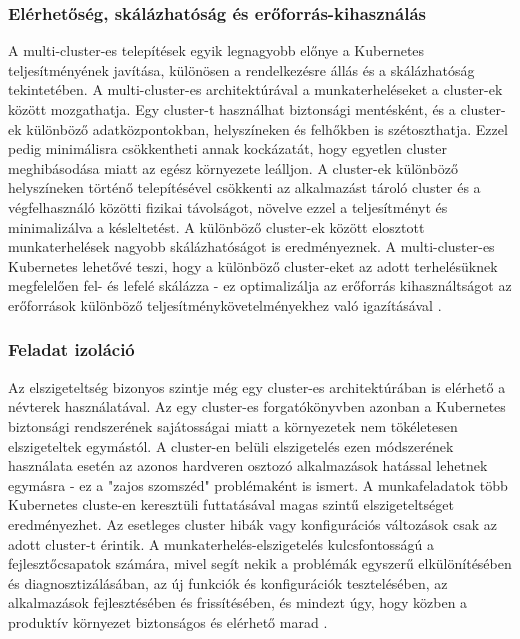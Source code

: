 \subsubsection*{Elérhetőség, skálázhatóság és erőforrás-kihasználás}
A multi-cluster-es telepítések egyik legnagyobb előnye a Kubernetes teljesítményének javítása, különösen a rendelkezésre állás és a skálázhatóság tekintetében.
A multi-cluster-es architektúrával a munkaterheléseket a cluster-ek között mozgathatja.
Egy cluster-t használhat biztonsági mentésként, és a cluster-ek különböző adatközpontokban, helyszíneken és felhőkben is szétoszthatja.
Ezzel pedig minimálisra csökkentheti annak kockázatát, hogy egyetlen cluster meghibásodása miatt az egész környezete leálljon.
A cluster-ek különböző helyszíneken történő telepítésével csökkenti az alkalmazást tároló cluster és a végfelhasználó közötti fizikai távolságot, növelve ezzel a teljesítményt és minimalizálva a késleltetést.
A különböző cluster-ek között elosztott munkaterhelések nagyobb skálázhatóságot is eredményeznek.
A multi-cluster-es Kubernetes lehetővé teszi, hogy a különböző cluster-eket az adott terhelésüknek megfelelően fel- és lefelé skálázza - ez optimalizálja az erőforrás kihasználtságot az erőforrások különböző teljesítménykövetelményekhez való igazításával \cite{multicluster}.

\subsubsection*{Feladat izoláció}
Az elszigeteltség bizonyos szintje még egy cluster-es architektúrában is elérhető a névterek használatával.
Az egy cluster-es forgatókönyvben azonban a Kubernetes biztonsági rendszerének sajátosságai miatt a környezetek nem tökéletesen elszigeteltek egymástól.
A cluster-en belüli elszigetelés ezen módszerének használata esetén az azonos hardveren osztozó alkalmazások hatással lehetnek egymásra - ez a "zajos szomszéd" problémaként is ismert.
A munkafeladatok több Kubernetes cluste-en keresztüli futtatásával magas szintű elszigeteltséget eredményezhet.
Az esetleges cluster hibák vagy konfigurációs változások csak az adott cluster-t érintik.
A munkaterhelés-elszigetelés kulcsfontosságú a fejlesztőcsapatok számára, mivel segít nekik a problémák egyszerű elkülönítésében és diagnosztizálásában, az új funkciók és konfigurációk tesztelésében, az alkalmazások fejlesztésében és frissítésében, és mindezt úgy, hogy közben a produktív környezet biztonságos és elérhető marad \cite{multicluster}.

